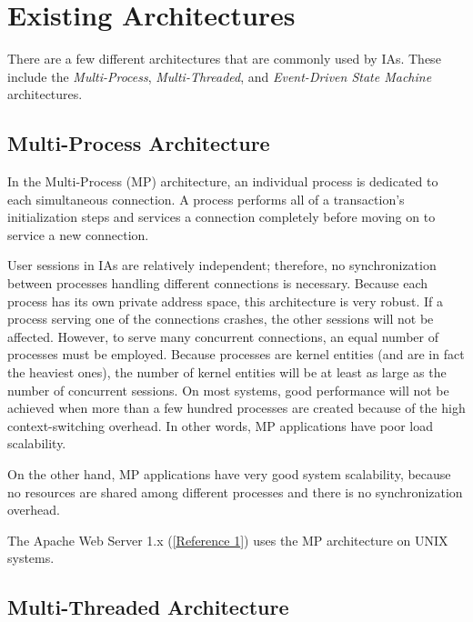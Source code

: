 \documentclass[a4paper,12pt,notitlepage,twoside,openright]{article}
\begin{document}
\hypertarget{existing-architectures}{%
\section{Existing Architectures}\label{existing-architectures}}

There are a few different architectures that are commonly used by IAs.
These include the \emph{Multi-Process}, \emph{Multi-Threaded}, and
\emph{Event-Driven State Machine} architectures.

\protect\hypertarget{MP}{}{}

\hypertarget{multi-process-architecture}{%
\subsection{Multi-Process
Architecture}\label{multi-process-architecture}}

In the Multi-Process (MP) architecture, an individual process is
dedicated to each simultaneous connection. A process performs all of a
transaction's initialization steps and services a connection completely
before moving on to service a new connection.

User sessions in IAs are relatively independent; therefore, no
synchronization between processes handling different connections is
necessary. Because each process has its own private address space, this
architecture is very robust. If a process serving one of the connections
crashes, the other sessions will not be affected. However, to serve many
concurrent connections, an equal number of processes must be employed.
Because processes are kernel entities (and are in fact the heaviest
ones), the number of kernel entities will be at least as large as the
number of concurrent sessions. On most systems, good performance will
not be achieved when more than a few hundred processes are created
because of the high context-switching overhead. In other words, MP
applications have poor load scalability.

On the other hand, MP applications have very good system scalability,
because no resources are shared among different processes and there is
no synchronization overhead.

The Apache Web Server 1.x (\protect\hyperlink{refs1}{{[}Reference 1{]}})
uses the MP architecture on UNIX systems.

\protect\hypertarget{MT}{}{}

\hypertarget{multi-threaded-architecture}{%
\subsection{Multi-Threaded
Architecture}\label{multi-threaded-architecture}}
\end{document}
